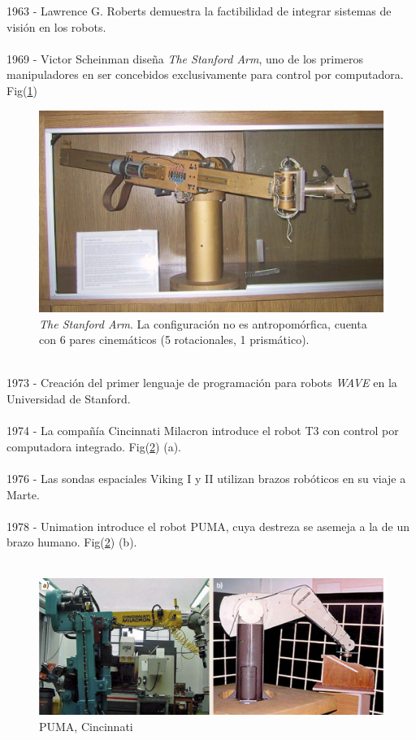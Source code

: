 1963 - Lawrence G. Roberts demuestra la factibilidad de integrar sistemas de visión en los robots.\\\\
1969 - Victor Scheinman diseña \textit{The Stanford Arm}, uno de los primeros manipuladores en ser concebidos exclusivamente para control por computadora. Fig(\ref{stfarm})\\
\begin{figure}[h!]
	\centering
	\includegraphics[scale=0.3]{Capitulo1/figs/StanfordArm.jpg} 
	\caption{\textit{The Stanford Arm}. La configuración no es antropomórfica, cuenta con 6 pares cinemáticos (5 rotacionales, 1 prismático).}
	\label{stfarm}
\end{figure}\\
1973 - Creación del primer lenguaje de programación para robots \textit{WAVE} en la Universidad de Stanford.\\\\
1974 - La compañía Cincinnati Milacron introduce el robot T3 con control por computadora integrado. Fig(\ref{puma}) (a).\\\\
1976 - Las sondas espaciales Viking I y II utilizan brazos robóticos en su viaje a Marte.\\\\
1978 - Unimation introduce el robot PUMA, cuya destreza se asemeja a la de un brazo humano. Fig(\ref{puma}) (b).\\\\
\begin{figure}[h!]
	\centering
	\includegraphics[scale=0.3]{Capitulo1/figs/puma.PNG} 
	\caption{PUMA, Cincinnati}
	\label{puma}
\end{figure}\\